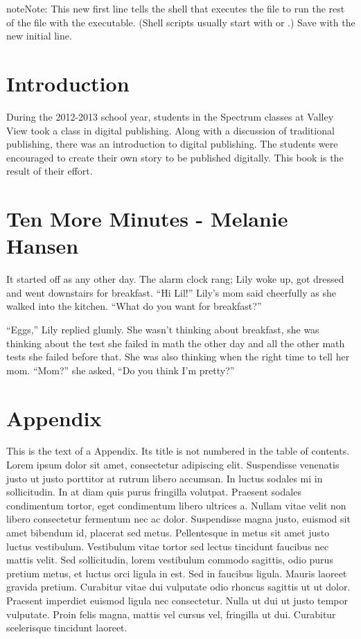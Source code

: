 \documentclass[12pt]{memoir}
\begin{document}
\begin{notice}{note}{Note:}
This new first line tells the shell that executes the file to
run the rest of the file with the 
executable. (Shell scripts usually start with  or
.) Save  with the new initial line.
\end{notice}

\chapter{Introduction}

During the 2012-2013 school year, students in the Spectrum classes at Valley View took a class in digital publishing. Along with a discussion of traditional publishing, there was an introduction to digital publishing. The students were encouraged to create their own story to be published digitally. This book is the result of their effort.

\chapter{Ten More Minutes - Melanie Hansen}



It started off as any other day. The alarm clock rang; Lily woke up, got dressed and went downstairs for breakfast. “Hi Lil!” Lily’s mom said cheerfully as she walked into the kitchen. “What do you want for breakfast?”

“Eggs,” Lily replied glumly. She wasn’t thinking about breakfast, she was thinking about the test she failed in math the other day and all the other math tests she failed before that. She was also thinking when the right time to tell her mom. “Mom?” she asked, “Do you think I’m pretty?”

\chapter*{Appendix}
This is the text of a Appendix. Its title is not numbered in the table of contents. Lorem ipsum dolor sit amet, consectetur adipiscing elit. Suspendisse venenatis justo ut justo porttitor at rutrum libero accumsan. In luctus sodales mi in sollicitudin. In at diam quis purus fringilla volutpat. Praesent sodales condimentum tortor, eget condimentum libero ultrices a. Nullam vitae velit non libero consectetur fermentum nec ac dolor. Suspendisse magna justo, euismod sit amet bibendum id, placerat sed metus. Pellentesque in metus sit amet justo luctus vestibulum. Vestibulum vitae tortor sed lectus tincidunt faucibus nec mattis velit. Sed sollicitudin, lorem vestibulum commodo sagittis, odio purus pretium metus, et luctus orci ligula in est. Sed in faucibus ligula. Mauris laoreet gravida pretium. Curabitur vitae dui vulputate odio rhoncus sagittis ut ut dolor. Praesent imperdiet euismod ligula nec consectetur. Nulla ut dui ut justo tempor vulputate. Proin felis magna, mattis vel cursus vel, fringilla ut dui. Curabitur scelerisque tincidunt laoreet.
\end{document}
